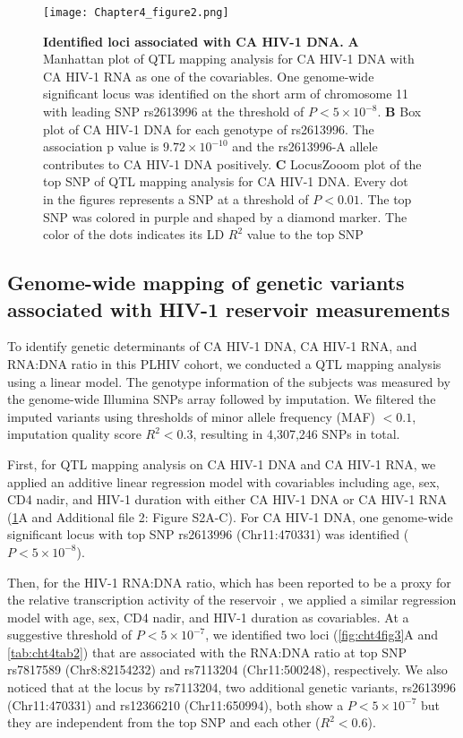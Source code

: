 \documentclass{book}
\begin{document}
\begin{refsection}
\begin{figure}
  \texttt{[image: Chapter4\_figure2.png]}
  \caption{
    \label{fig:cht4fig2} \textbf{Identified loci associated with CA HIV-1 DNA.}
    \textbf{A} Manhattan plot of QTL mapping analysis for CA HIV-1 DNA with CA HIV-1 RNA as one of the covariables. One genome-wide significant locus was identified on the short arm of chromosome 11 with leading SNP rs2613996 at the threshold of $P < 5 \times 10^{-8}$.
    \textbf{B} Box plot of CA HIV-1 DNA for each genotype of rs2613996. The association p value is $9.72 \times 10^{-10}$ and the rs2613996-A allele contributes to CA HIV-1 DNA positively.
    \textbf{C} LocusZooom plot of the top SNP of QTL mapping analysis for CA HIV-1 DNA. Every dot in the figures represents a SNP at a threshold of $P < 0.01$. The top SNP was colored in purple and shaped by a diamond marker. The color of the dots indicates its LD $R^2$ value to the top SNP
  }
\end{figure}

\subsection*{Genome-wide mapping of genetic variants associated with HIV-1 reservoir measurements}
To identify genetic determinants of CA HIV-1 DNA, CA HIV-1 RNA, and RNA:DNA ratio in this PLHIV cohort, we conducted a QTL mapping analysis using a linear model.
The genotype information of the subjects was measured by the genome-wide Illumina SNPs array followed by imputation.
We filtered the imputed variants using thresholds of minor allele frequency (MAF) $< 0.1$, imputation quality score $R^2 < 0.3$, resulting in 4,307,246 SNPs in total.

First, for QTL mapping analysis on CA HIV-1 DNA and CA HIV-1 RNA, we applied an additive linear regression model with covariables including age, sex, CD4 nadir, and HIV-1 duration with either CA HIV-1 DNA or CA HIV-1 RNA (\ref{fig:cht4fig2}A and Additional file 2: Figure S2A-C).
For CA HIV-1 DNA, one genome-wide significant locus with top SNP rs2613996 (Chr11:470331) was identified ($P < 5 \times 10^{-8}$).

Then, for the HIV-1 RNA:DNA ratio, which has been reported to be a proxy for the relative transcription activity of the reservoir \cite{Pasternak2018What,Hong2016Novel}, we applied a similar regression model with age, sex, CD4 nadir, and HIV-1 duration as covariables.
At a suggestive threshold of $P < 5 \times 10^{-7}$, we identified two loci (\ref{fig:cht4fig3}A and \ref{tab:cht4tab2}) that are associated with the RNA:DNA ratio at top SNP rs7817589 (Chr8:82154232) and rs7113204 (Chr11:500248), respectively.
We also noticed that at the locus by rs7113204, two additional genetic variants, rs2613996 (Chr11:470331) and rs12366210 (Chr11:650994), both show a $P < 5 \times 10^{-7}$ but they are independent from the top SNP and each other ($R^2 < 0.6$).


\end{refsection}
\end{document}
